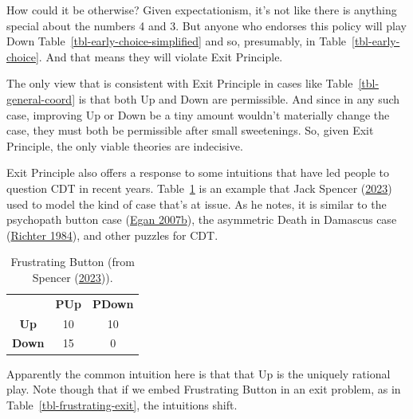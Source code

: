 \documentclass[
  12pt,
  letterpaper,
  DIV=11,
  numbers=noendperiod]{scrreprt}
\begin{document}
How could it be otherwise? Given expectationism, it's not like there is
anything special about the numbers 4 and 3. But anyone who endorses this
policy will play Down Table~\ref{tbl-early-choice-simplified} and so,
presumably, in Table~\ref{tbl-early-choice}. And that means they will
violate Exit Principle.

The only view that is consistent with Exit Principle in cases like
Table~\ref{tbl-general-coord} is that both Up and Down are permissible.
And since in any such case, improving Up or Down be a tiny amount
wouldn't materially change the case, they must both be permissible after
small sweetenings. So, given Exit Principle, the only viable theories
are indecisive.

Exit Principle also offers a response to some intuitions that have led
people to question CDT in recent years.
Table~\ref{tbl-frustrating-button} is an example that Jack Spencer
(\protect\hyperlink{ref-Spencer2023}{2023}) used to model the kind of
case that's at issue. As he notes, it is similar to the psychopath
button case (\protect\hyperlink{ref-Egan2007-EGASCT}{Egan 2007b}), the
asymmetric Death in Damascus case
(\protect\hyperlink{ref-Richter1984}{Richter 1984}), and other puzzles
for CDT.

\hypertarget{tbl-frustrating-button}{}
\begin{longtable}[]{@{}ccc@{}}
\caption{\label{tbl-frustrating-button}Frustrating Button (from Spencer
(\protect\hyperlink{ref-Spencer2023}{2023})).}\tabularnewline
\toprule\noalign{}
\endfirsthead
\endhead
\bottomrule\noalign{}
\endlastfoot
& \textbf{PUp} & \textbf{PDown} \\
\textbf{Up} & 10 & 10 \\
\textbf{Down} & 15 & 0 \\
\end{longtable}

Apparently the common intuition here is that that Up is the uniquely
rational play. Note though that if we embed Frustrating Button in an
exit problem, as in Table~\ref{tbl-frustrating-exit}, the intuitions
shift.
\end{document}
